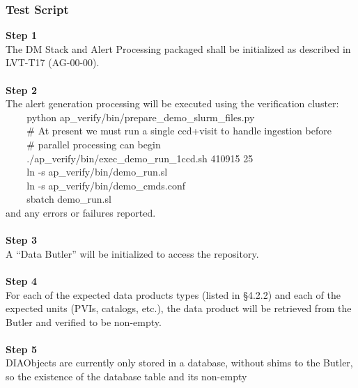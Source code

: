 \hypertarget{test-script-24}{%
\subsubsection{Test Script}\label{test-script-24}}

\textbf{Step 1}\\
The DM Stack and Alert Processing packaged shall be initialized as
described in LVT-T17 (AG-00-00).\\
~\\
\textbf{Step 2}\\
The alert generation processing will be executed using the verification
cluster:\\
\hspace*{0.333em} ~ ~ ~python
ap\_verify/bin/prepare\_demo\_slurm\_files.py\\
\hspace*{0.333em} ~ ~ ~\# At present we must run a single ccd+visit to
handle ingestion before\\
\hspace*{0.333em} ~ ~ ~\# parallel processing can begin\\
\hspace*{0.333em} ~ ~ ~./ap\_verify/bin/exec\_demo\_run\_1ccd.sh 410915
25\\
\hspace*{0.333em} ~ ~ ~ln -s ap\_verify/bin/demo\_run.sl\\
\hspace*{0.333em} ~ ~ ~ln -s ap\_verify/bin/demo\_cmds.conf\\
\hspace*{0.333em} ~ ~ ~sbatch demo\_run.sl\\
and any errors or failures reported.\\
~\\
\textbf{Step 3}\\
A ``Data Butler'' will be initialized to access the repository.\\
~\\
\textbf{Step 4}\\
For each of the expected data products types (listed in §4.2.2) and each
of the expected units (PVIs, catalogs, etc.), the data product will be
retrieved from the Butler and verified to be non-empty.\\
~\\
\textbf{Step 5}\\
DIAObjects are currently only stored in a database, without shims to the
Butler, so the existence of the database table and its non-empty
